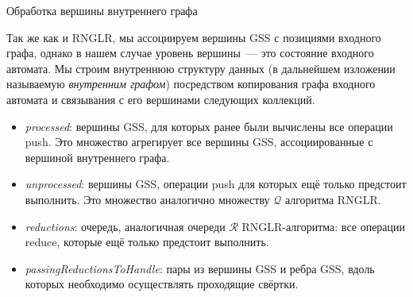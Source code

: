 \begin{algorithm}[H]
\begin{algorithmic}[1]
\caption{Обработка вершины внутреннего графа}
\label{processVertex}
    \EndFor
  \EndFor
\EndFunction

    \EndFor
  \EndWhile
\EndFunction

      \EndFor
    \EndFor
  \EndFor
\EndFunction
\end{algorithmic}
\end{algorithm}

Так же как и RNGLR, мы ассоциируем вершины GSS с позициями входного графа, однако в нашем случае уровень вершины~--- это состояние входного автомата. Мы строим внутреннюю структуру данных (в дальнейшем изложении называемую \emph{внутренним графом}) посредством копирования графа входного автомата и связывания с его вершинами следующих коллекций.
\begin{itemize}
  \item \emph{processed}: вершины GSS, для которых ранее были вычислены все операции push. Это множество агрегирует все вершины GSS, ассоциированные с вершиной внутреннего графа.
  \item \emph{unprocessed}: вершины GSS, операции push для которых ещё только предстоит выполнить. Это множество аналогично множеству $\mathcal{Q}$ алгоритма RNGLR.
  \item \emph{reductions}: очередь, аналогичная очереди $\mathcal{R}$ RNGLR-алгоритма: все операции reduce, которые ещё только предстоит выполнить.
  \item \emph{passingReductionsToHandle}: пары из вершины GSS и ребра GSS, вдоль которых необходимо осуществлять проходящие свёртки.
\end{itemize}

